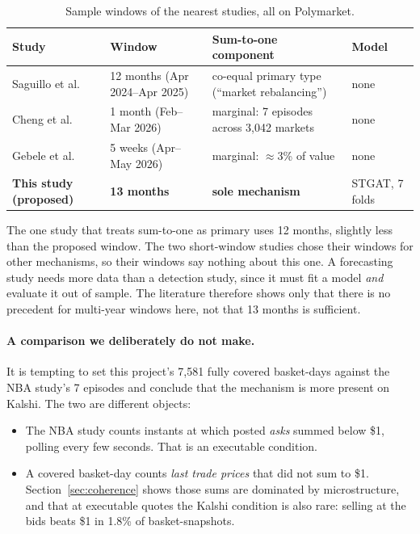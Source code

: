 \documentclass[11pt,a4paper]{article}
\begin{document}
\begin{table}[h]
\centering\small
\caption{Sample windows of the nearest studies, all on Polymarket.}
\label{tab:litwin}
\begin{tabular}{p{4.3cm}p{2.6cm}p{4.4cm}p{1.9cm}}
\toprule
Study & Window & Sum-to-one component & Model \\
\midrule
Saguillo et al.\ \cite{saguillo2025} & 12 months (Apr 2024--Apr 2025) & co-equal
primary type (``market rebalancing'') & none \\
Cheng et al.\ \cite{cheng2026nba} & 1 month (Feb--Mar 2026) & marginal: 7 episodes
across 3{,}042 markets & none \\
Gebele et al.\ \cite{gebele2026} & 5 weeks (Apr--May 2026) & marginal: $\approx$3\%
of value & none \\
\textbf{This study (proposed)} & \textbf{13 months} & \textbf{sole mechanism} &
STGAT, 7 folds \\
\bottomrule
\end{tabular}
\end{table}

The one study that treats sum-to-one as primary uses 12 months, slightly less
than the proposed window. The two short-window studies chose their windows for
other mechanisms, so their windows say nothing about this one. A forecasting
study needs more data than a detection study, since it must fit a model
\emph{and} evaluate it out of sample. The literature therefore shows only that
there is no precedent for multi-year windows here, not that 13 months is
sufficient.

\paragraph{A comparison we deliberately do not make.} It is tempting to set this
project's 7{,}581 fully covered basket-days against the NBA study's 7 episodes and
conclude that the mechanism is more present on Kalshi. The two are different
objects:
\begin{itemize}
  \item The NBA study counts instants at which posted \emph{asks} summed below
    \$1, polling every few seconds. That is an executable condition.
  \item A covered basket-day counts \emph{last trade prices} that did not sum to
    \$1. Section~\ref{sec:coherence} shows those sums are dominated by
    microstructure, and that at executable quotes the Kalshi condition is also
    rare: selling at the bids beats \$1 in 1.8\% of basket-snapshots.
\end{itemize}
\end{document}
